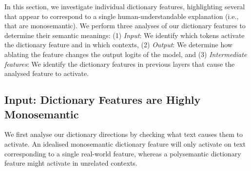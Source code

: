 \label{section:monosemantic}
In this section, we investigate individual dictionary features, highlighting several that appear to correspond to a single human-understandable explanation (i.e., that are monosemantic). We perform three analyses of our dictionary features to determine their semantic meanings: (1) \textit{Input}: We identify which tokens activate the dictionary feature and in which contexts, (2) \textit{Output}: We determine how ablating the feature changes the output logits of the model, and (3) \textit{Intermediate features}: We identify the dictionary features in previous layers that cause the analysed feature to activate.

\subsection{Input: Dictionary Features are Highly Monosemantic}
We first analyse our dictionary directions by checking what text causes them to activate. An idealised monosemantic dictionary feature will only activate on text corresponding to a single real-world feature, whereas a polysemantic dictionary feature might activate in unrelated contexts. 


 
